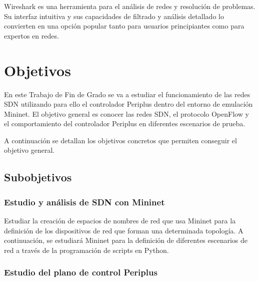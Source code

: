 \documentclass[a4paper, 12pt]{book}
\begin{document}
	
	Wireshark es una herramienta para el análisis de redes y resolución de problemas. Su interfaz intuitiva y sus capacidades de filtrado y análisis detallado lo convierten en una opción popular tanto para usuarios principiantes como para expertos en redes.
		
	
	
	\cleardoublepage %
	\chapter{Objetivos} %
	\label{chap:objetivos} %
	
	En este Trabajo de Fin de Grado se va a estudiar el funcionamiento de las redes SDN
	utilizando para ello el controlador Periplus dentro
	del entorno de emulación Mininet. El objetivo
	general es conocer las redes SDN, el protocolo
	OpenFlow y el comportamiento del controlador
	Periplus en diferentes escenarios de prueba. 
	
	A continuación se detallan los objetivos concretos que permiten conseguir el objetivo general.
	\section{Subobjetivos}
	\subsection{Estudio y análisis de SDN con Mininet} %
	\label{sec:objetivo-mininet} %
	
	Estudiar la creación de espacios de nombres de red que usa Mininet para la definición
	de los dispositivos de red que forman una determinada topología. A continuación, se estudiará Mininet para la	definición de diferentes escenarios de	red a través de la programación de scripts en Python.
		
	
	\subsection{Estudio del plano de control Periplus}
	\label{sec:objetivos-periplus}
	
\end{document}
